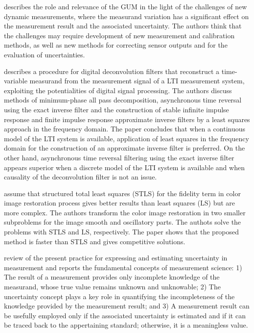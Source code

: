 \documentclass[11pt]{article}
\begin{document}
\citet{Esward09} describes the role and relevance of the GUM in the light of the challenges of new dynamic measurements, where the measurand variation has a significant effect on the measurement result and the associated uncertainty. The authors think that the challenges may require development of new measurement and calibration methods, as well as new methods for correcting sensor outputs and for the evaluation of uncertainties. 

\citet{Eichstadt10} describes a procedure for digital deconvolution filters that reconstruct a time-variable measurand from the measurement signal of a LTI measurement system, exploiting the potentialities of digital signal processing. The authors discuss methods of minimum-phase all pass decomposition, asynchronous time reversal using the exact inverse filter and the construction of stable infinite impulse response and finite impulse response approximate inverse filters by a least squares approach in the frequency domain. The paper concludes that when a continuous model of the LTI system is available, application of least squares in the frequency domain for the construction of an approximate inverse filter is preferred. On the other hand, asynchronous time reversal filtering using the exact inverse filter appears superior when a discrete model of the LTI system is available and when causality of the deconvolution filter is not an issue.

\citet{Feiz17} assume that structured total least squares (STLS) for the fidelity term in color image restoration process gives better results than least squares (LS) but are more complex. The authors transform the color image restoration in two smaller subproblems for the image smooth and oscillatory parts. The authots solve the problems with STLS and LS, respectively. The paper shows that the proposed method is faster than STLS and gives competitive solutions. 

\citet{Ferrero06} review of the present practice for expressing and estimating uncertainty in measurement and reports the  fundamental concepts of measurement science: 1) The result of a measurement provides only incomplete knowledge of the measurand, whose true value remains unknown and unknowable; 2) The uncertainty concept plays a key role in quantifying the incompleteness of the knowledge provided by the measurement result; and 3) A measurement result can be usefully employed only if the associated uncertainty is estimated and if it can be traced back to the appertaining standard; otherwise, it is a meaningless value.
\end{document}
